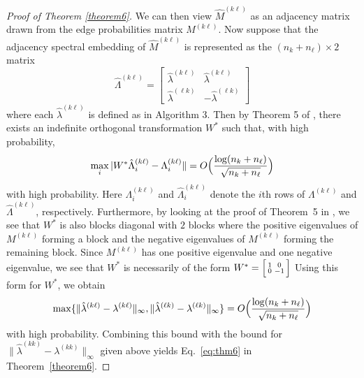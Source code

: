 \documentclass[12pt]{article}
\begin{document}
\begin{proof}[Proof of Theorem \ref{theorem6}]
We can then view \(\hat{M}^{(k \ell)}\) as an adjacency matrix drawn from
the edge probabilities matrix \(M^{(k \ell)}\). Now suppose that the adjacency spectral
embedding of $\hat{M}^{(k \ell)}$ is represented as the $(n_k +
n_{\ell}) \times 2$ matrix
\[\hat{\Lambda}^{(k \ell)} = \begin{bmatrix} 
  \hat{\lambda}^{(k \ell)} & \hat{\lambda}^{(k \ell)} \\ 
  \hat{\lambda}^{(\ell k)} & -\hat{\lambda}^{(\ell k)} 
\end{bmatrix}\]
where each \(\hat{\lambda}^{(k \ell)}\) is defined as in Algorithm 3. Then
by Theorem 5 of \citet{rubindelanchy2017statistical}, there
exists an indefinite orthogonal transformation $W^{*}$ such that,  with
high probability,
$$\max_{i} |W^{*} \hat{\Lambda}_{i}^{(k \ell)} - \Lambda_{i}^{(k \ell)} \| =
O\Bigl(\frac{\log (n_k + n_{\ell})}{\sqrt{n_k + n_{\ell}}}\Bigr)$$
with high probability. Here $\Lambda_{i}^{(k \ell)}$ and
$\hat{\Lambda}_i^{(k \ell)}$ denote the $i$th rows of $\Lambda^{(k
  \ell)}$ and $\hat{\Lambda}^{(k \ell)}$, respectively. 
Furthermore, by looking at the proof of Theorem~5 in
\citep{rubindelanchy2017statistical}, we see that $W^{*}$ is also
blocks diagonal with $2$ blocks where the positive eigenvalues of $M^{(k \ell)}$
forming a block and the negative eigenvalues of $M^{(k \ell)}$ forming
the remaining block. %
Since $M^{(k \ell)}$ has one positive eigenvalue and one negative
eigenvalue, we see that $W^{*}$ is necessarily of the form $W^{*}
= \Bigl[\begin{smallmatrix} 1 & 0 \\ 0 & - 1\end{smallmatrix}\Bigr]$
Using this form for $W^{*}$, we obtain
$$\max\{\|\hat{\lambda}^{(k \ell)} - \lambda^{(k \ell)}\|_{\infty},
\|\hat{\lambda}^{(\ell k)} - \lambda^{(\ell k)}\|_{\infty}\}  =
O\Bigl(\frac{\log(n_k + n_{\ell})}{\sqrt{n_k + n_{\ell}}}\Bigr)$$
with high probability. Combining this bound with the bound for
$\|\hat{\lambda}^{(kk)} - \lambda^{(kk)}\|_{\infty}$ given above
yields Eq.~\eqref{eq:thm6} in Theorem~\ref{theorem6}. 
\end{proof}
\end{document}
